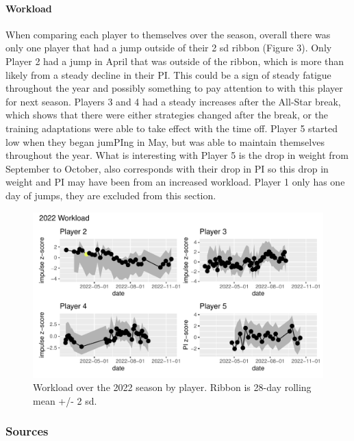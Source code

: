\documentclass[
  12pt,
]{article}
\begin{document}
\hypertarget{workload}{%
\paragraph{Workload}\label{workload}}

When comparing each player to themselves over the season, overall there
was only one player that had a jump outside of their 2 sd ribbon (Figure
3). Only Player 2 had a jump in April that was outside of the ribbon,
which is more than likely from a steady decline in their PI. This could
be a sign of steady fatigue throughout the year and possibly something
to pay attention to with this player for next season. Players 3 and 4
had a steady increases after the All-Star break, which shows that there
were either strategies changed after the break, or the training
adaptations were able to take effect with the time off. Player 5 started
low when they began jumPIng in May, but was able to maintain themselves
throughout the year. What is interesting with Player 5 is the drop in
weight from September to October, also corresponds with their drop in PI
so this drop in weight and PI may have been from an increased workload.
Player 1 only has one day of jumps, they are excluded from this section.

\begin{figure}
\centering
\includegraphics{report_code_files/figure-latex/workload-1.pdf}
\caption{Workload over the 2022 season by player. Ribbon is 28-day
rolling mean +/- 2 sd.}
\end{figure}

\hypertarget{sources}{%
\subsubsection{Sources}\label{sources}}
\end{document}
